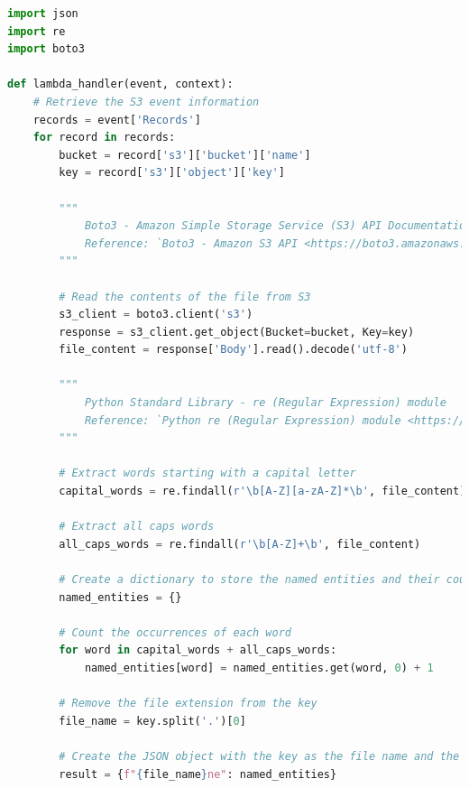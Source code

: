 

\begin{mdframed}[linewidth=1pt]
\lstset{style=mystyle}
\begin{lstlisting}[language=Python]
import json
import re
import boto3

def lambda_handler(event, context):
    # Retrieve the S3 event information
    records = event['Records']
    for record in records:
        bucket = record['s3']['bucket']['name']
        key = record['s3']['object']['key']
        
        """
            Boto3 - Amazon Simple Storage Service (S3) API Documentation
            Reference: `Boto3 - Amazon S3 API <https://boto3.amazonaws.com/v1/documentation/api/latest/reference/services/s3.html>`_
        """

        # Read the contents of the file from S3
        s3_client = boto3.client('s3')
        response = s3_client.get_object(Bucket=bucket, Key=key)
        file_content = response['Body'].read().decode('utf-8')
        
        """
            Python Standard Library - re (Regular Expression) module
            Reference: `Python re (Regular Expression) module <https://docs.python.org/3/library/re.html>`_
        """

        # Extract words starting with a capital letter
        capital_words = re.findall(r'\b[A-Z][a-zA-Z]*\b', file_content)
        
        # Extract all caps words
        all_caps_words = re.findall(r'\b[A-Z]+\b', file_content)
        
        # Create a dictionary to store the named entities and their counts
        named_entities = {}
        
        # Count the occurrences of each word
        for word in capital_words + all_caps_words:
            named_entities[word] = named_entities.get(word, 0) + 1
        
        # Remove the file extension from the key
        file_name = key.split('.')[0]
        
        # Create the JSON object with the key as the file name and the named entities dictionary as the value
        result = {f"{file_name}ne": named_entities}
        

\end{lstlisting}
\end{mdframed}
